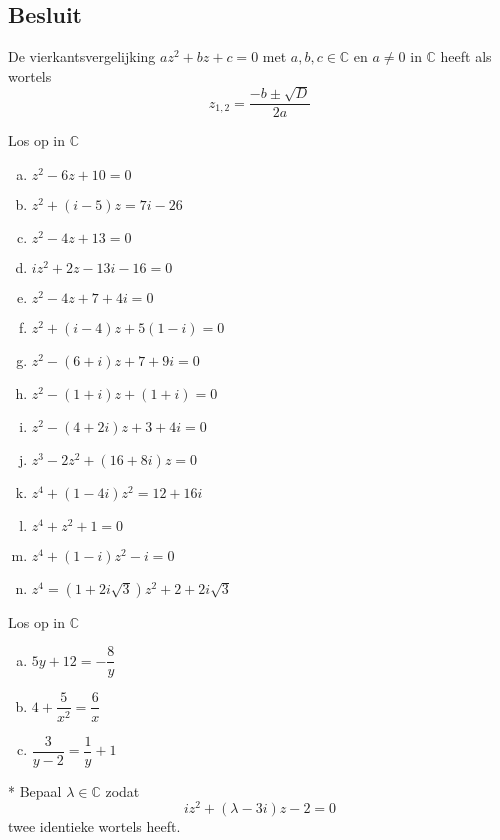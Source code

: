 \documentclass[12pt,twoside,a4paper]{article}
\begin{document}
\subsection{Besluit}

\begin{mdframed}
De vierkantsvergelijking $az^2+bz+c=0$ met $a,b,c\in\mathbb{C}$ en $a\neq 0$ in $\mathbb{C}$ heeft als wortels
$$ z_{1,2}=\dfrac{-b\pm\sqrt{D}}{2a}$$
\end{mdframed}

\begin{oefening}
  Los op in $\mathbb{C}$
  \begin{multicols}{2}
    \begin{enumerate}[(a)]
      \itemsep 1em
    \item $z^2-6z+10=0$
    \item $z^2+(i-5)z=7i-26$
    \item $z^2-4z+13=0$
    \item $iz^2+2z-13i-16=0$
    \item $z^2-4z+7+4i=0$
    \item $z^2+(i-4)z+5(1-i)=0$
    \item $z^2-(6+i)z+7+9i=0$
    \item $z^2-(1+i)z+(1+i)=0$
    \item $z^2-(4+2i)z+3+4i=0$
    \item $z^3-2z^2+(16+8i)z=0$
    \item $z^4+(1-4i)z^2=12+16i$
    \item $z^4+z^2+1=0$
    \item $z^4+(1-i)z^2-i=0$
    \item $z^4=(1+2i\sqrt{3})z^2+2+2i\sqrt{3}$
    \end{enumerate}
  \end{multicols}
\end{oefening}

\begin{oefening}
Los op in $\mathbb{C}$
  \begin{enumerate}[(a)]
    \itemsep 1em
  \item $5y+12=-\dfrac{8}{y}$
  \item $4+\dfrac{5}{x^2}=\dfrac{6}{x}$
  \item $\dfrac{3}{y-2}=\dfrac{1}{y}+1$
  \end{enumerate}
\end{oefening}

\pagebreak
\begin{oefening}*
  Bepaal $\lambda\in\mathbb{C}$ zodat
  \[iz^2+(\lambda-3i)z-2=0\]
  twee identieke wortels heeft.
\end{oefening}
\end{document}
